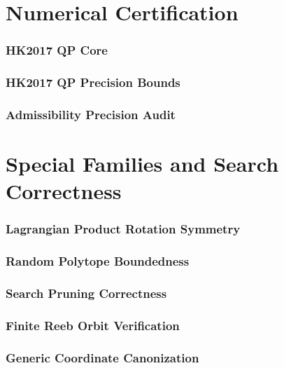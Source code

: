\documentclass{article}
\begin{document}
\part{Numerical Certification}

\section{HK2017 QP Core}


\section{HK2017 QP Precision Bounds}


\section{Admissibility Precision Audit}


\part{Special Families and Search Correctness}

\section{Lagrangian Product Rotation Symmetry}


\section{Random Polytope Boundedness}


\section{Search Pruning Correctness}


\section{Finite Reeb Orbit Verification}


\section{Generic Coordinate Canonization}


\printbibliography
\end{document}
